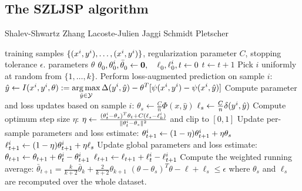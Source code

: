 
\subsection{The SZLJSP algorithm}
\begin{algorithm*}[t]
    \caption{Shalev-Shwartz Zhang Lacoste-Julien Jaggi Schmidt Pletscher\label{alg_szljsp}}
    \begin{doublespacing}
    \begin{algorithmic}[1]
        \Require training samples $\{ (x^{i}, y^{i}), \dots, (x^{i}, y^{i})\}$, regularization parameter $C$, stopping tolerance $\epsilon$.
        \Ensure parameters $\theta$
        \State  $\displaystyle \theta_0^{\vphantom{i}}, \theta_0^{i}, \bar{\theta}_0^{\vphantom{i}} \leftarrow \mathbf{0},\quad \ell_0^{\vphantom{i}}, \ell_0^{i}, t \leftarrow 0 $
        \Repeat
            \State $t \leftarrow t + 1$
            \State Pick $i$ uniformly at random from $\{1, \dotsc, k\}$.
            \State Perform loss-augmented prediction on sample $i$:
            \Statex[2]   $\hat{y} \leftarrow I(x^{i}, y^{i}, \theta) := \displaystyle \operatorname*{arg\,max}_{\hat{y}\in\mathcal{Y}} \Delta(y^{i}, \hat{y}) - \theta^T [\psi(x^{i}, y^{i}) - \psi(x^{i}, \hat{y})]$
            \State Compute parameter and loss updates based on sample $i$:
            \Statex[2]     $\theta_s \leftarrow \frac{C}{n} \Phi(x, \hat{y})$
            \Statex[2]     $\ell_s \leftarrow \frac{C}{n} \delta(y^{i}, \hat{y})$
            \State Compute optimum step size $\eta$:
            \Statex[2]    $\eta \leftarrow \frac{(\theta_t^{i} - \theta_s)^T \theta_t + C (\ell_s - \ell_k^{i} )}{\lVert \theta_t^{i} - \theta_s \rVert^2}$ and clip to $[0, 1]$
            \State Update per-sample parameters and loss estimate:
            \Statex[2]    $\theta_{t+1}^{i} \leftarrow (1 - \eta) \theta_{t+1}^{i} + \eta \theta_s$
            \Statex[2]    $\ell_{t+1}^{i} \leftarrow (1 - \eta) \theta_{t+1}^{i} + \eta \ell_s$
            \State Update global parameters and loss estimate:
            \Statex[2]   $\theta_{t+1} \leftarrow \theta_{t+1} + \theta_{t}^{i} - \theta_{t+1}^{i}$
            \Statex[2]   $\ell_{t+1} \leftarrow \ell_{t+1} + \ell_{t}^{i} - \ell_{t+1}^{i}$
            \State Compute the weighted running average:
            \Statex[2] $\bar{\theta}_{t+1} = \frac{k}{k + 2} \bar{\theta}_k + \frac{2}{k + 2}\theta_{k+1}$
        \Until $(\theta - \theta_s)^T\theta - \ell + \ell_s \leq \epsilon$
        \Statex where $\theta_s$ and $\ell_s$ are recomputed over the whole dataset.
    \end{algorithmic}
    \end{doublespacing}
\end{algorithm*}


